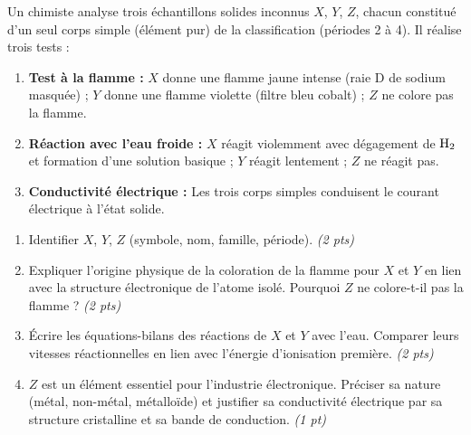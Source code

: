 \documentclass[11pt]{article}
\begin{document}
\begin{exercice}
Un chimiste analyse trois échantillons solides inconnus $X$, $Y$, $Z$, chacun constitué d'un seul corps simple (élément pur) de la classification (périodes 2 à 4). Il réalise trois tests :
\begin{enumerate}
    \item \textbf{Test à la flamme :} $X$ donne une flamme jaune intense (raie D de sodium masquée) ; $Y$ donne une flamme violette (filtre bleu cobalt) ; $Z$ ne colore pas la flamme.
    \item \textbf{Réaction avec l'eau froide :} $X$ réagit violemment avec dégagement de $\ce{H2}$ et formation d'une solution basique ; $Y$ réagit lentement ; $Z$ ne réagit pas.
    \item \textbf{Conductivité électrique :} Les trois corps simples conduisent le courant électrique à l'état solide.
\end{enumerate}
\begin{enumerate}
    \item Identifier $X$, $Y$, $Z$ (symbole, nom, famille, période). \textit{(2 pts)}
    \item Expliquer l'origine physique de la coloration de la flamme pour $X$ et $Y$ en lien avec la structure électronique de l'atome isolé. Pourquoi $Z$ ne colore-t-il pas la flamme ? \textit{(2 pts)}
    \item Écrire les équations-bilans des réactions de $X$ et $Y$ avec l'eau. Comparer leurs vitesses réactionnelles en lien avec l'énergie d'ionisation première. \textit{(2 pts)}
    \item $Z$ est un élément essentiel pour l'industrie électronique. Préciser sa nature (métal, non-métal, métalloïde) et justifier sa conductivité électrique par sa structure cristalline et sa bande de conduction. \textit{(1 pt)}
\end{enumerate}
\end{exercice}
\end{document}
